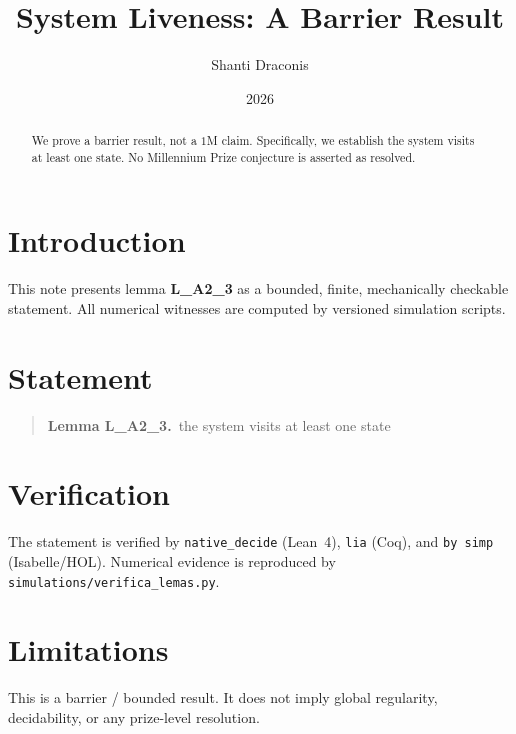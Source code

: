 \documentclass[11pt]{article}
\title{System Liveness: A Barrier Result}
\author{Shanti Draconis}
\date{2026}
\begin{document}
\maketitle

\begin{abstract}
We prove a barrier result, not a $1$M claim.
Specifically, we establish the system visits at least one state.
No Millennium Prize conjecture is asserted as resolved.
\end{abstract}

\section{Introduction}
This note presents lemma \textbf{L\_A2\_3} as a bounded, finite,
mechanically checkable statement.  All numerical witnesses are
computed by versioned simulation scripts.

\section{Statement}
\begin{quote}
  \textbf{Lemma L\_A2\_3.}~the system visits at least one state
\end{quote}

\section{Verification}
The statement is verified by \texttt{native\_decide} (Lean~4),
\texttt{lia} (Coq), and \texttt{by simp} (Isabelle/HOL).
Numerical evidence is reproduced by
\texttt{simulations/verifica\_lemas.py}.

\section{Limitations}
This is a barrier / bounded result.  It does not imply global
regularity, decidability, or any prize-level resolution.
\end{document}
